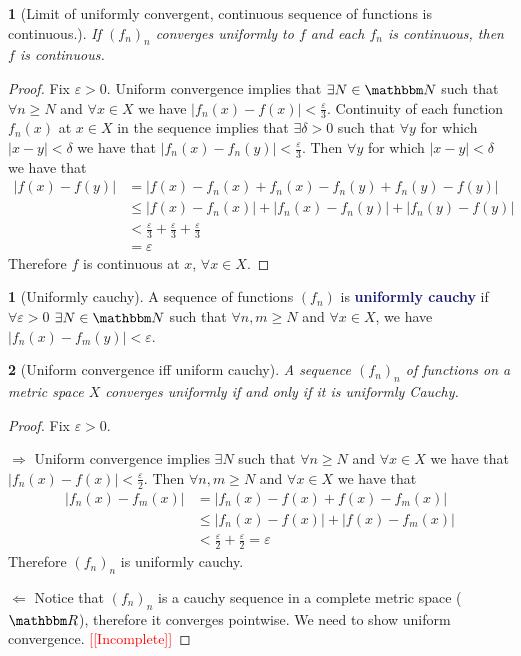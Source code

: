 \documentclass[12pt]{article}
\numberwithin{equation}{section}
\newcommand{\navy}[1]{\textcolor{MidnightBlue}{\bf #1}}
\theoremstyle{plain}
\newtheorem{theorem}{\color{ForestGreen}{\textbf{Theorem}}}[section]
\theoremstyle{definition}
\newtheorem{definition}{\color{MidnightBlue}{\textbf{Definition}}}[section]
\def\imp{\Rightarrow}
\def\pmi{\Leftarrow}
\newcommand{\1}{\mathbbm 1}
\def\d{\delta}
\newcommand{\e}{\varepsilon}
\newcommand{\RR}{\mathbbm R}
\newcommand{\NN}{\mathbbm N}
\begin{document}
\begin{theorem}[Limit of uniformly convergent, continuous sequence of functions is continuous.]
	If $(f_n)_n$ converges uniformly to $f$ and each $f_n$ is continuous, then $f$ is continuous.
\end{theorem}
\begin{proof}
	Fix $\e > 0$. Uniform convergence implies that $\exists N \in \NN$ such that $\forall n \geq N$ and $\forall x \in X$ we have $|f_n(x) - f(x)| < \frac{\e}{3}$. Continuity of each function $f_n(x)$ at $x \in X$ in the sequence implies that $\exists \d > 0$ such that $\forall y$ for which $|x - y| < \d$ we have that $|f_n(x) - f_n(y)| < \frac{\e}{3}$. Then $\forall y$ for which $|x - y| < \d$ we have that
	\begin{align*}
		|f(x) - f(y)| &= |f(x)- f_n(x) + f_n(x) - f_n(y) + f_n(y) - f(y)| \\
		&\leq |f(x)- f_n(x)| + |f_n(x) - f_n(y)| + |f_n(y) - f(y)| \tag{$\Delta$} \\
		&< \frac{\e}{3} + \frac{\e}{3} + \frac{\e}{3} \tag{uniform convergence and continuity of $f_n$ at $x$} \\
		&= \e
	\end{align*}
	Therefore $f$ is continuous at $x$, $\forall x \in X$.   
\end{proof}

\begin{definition}[Uniformly cauchy]
	A sequence of functions $(f_n)$ is \navy{uniformly cauchy} if $\forall \e > 0$ $\exists N \in \NN$ such that $\forall n,m \geq N$ and $\forall x \in X$, we have $|f_n(x) - f_m(y)| < \e$. 
\end{definition}


\begin{theorem}[Uniform convergence iff uniform cauchy]
	A sequence $(f_n)_n$ of functions on a metric space $X$ converges uniformly if and only if it is uniformly Cauchy.
\end{theorem}
\begin{proof} Fix $\e > 0$.

	$\imp$ Uniform convergence implies $\exists N$ such that $\forall n \geq N$ and $\forall x \in X$ we have that $|f_n(x)-f(x)|<\frac{\e}{2}$. Then $\forall n,m \geq N$ and $\forall x \in X$ we have that
	\begin{align*}
		|f_n(x) - f_m(x)| &= |f_n(x) - f(x) + f(x) - f_m(x)| \\
		&\leq |f_n(x) - f(x)| + |f(x) - f_m(x)| \\
		&< \frac{\e}{2} + \frac{\e}{2} = \e
	\end{align*}
	Therefore $(f_n)_n$ is uniformly cauchy. 

	$\pmi$ Notice that $(f_n)_n$ is a cauchy sequence in a complete metric space ($\RR$), therefore it converges pointwise. We need to show uniform convergence. \textcolor{red}{[[Incomplete]]}
\end{proof}
\end{document}
